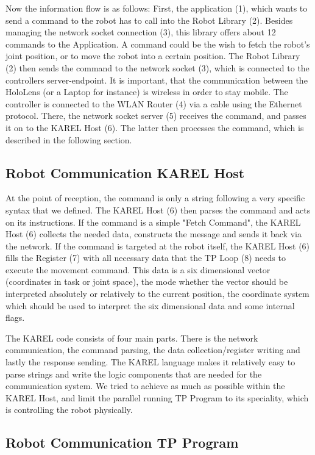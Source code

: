 Now the information flow is as follows: First, the application (1), which wants to send a command to the robot has to call into the Robot Library (2). Besides managing the network socket connection (3), this library offers about 12 commands to the Application. A command could be the wish to fetch the robot's joint position, or to move the robot into a certain position. The Robot Library (2) then sends the command to the network socket (3), which is connected to the controllers server-endpoint. It is important, that the communication between the HoloLens (or a Laptop for instance) is wireless in order to stay mobile. The controller is connected to the WLAN Router (4) via a cable using the Ethernet protocol. There, the network socket server (5) receives the command, and passes it on to the KAREL Host (6). The latter then processes the command, which is described in the following section.

\subsection{Robot Communication KAREL Host}

At the point of reception, the command is only a string following a very specific syntax that we defined. The KAREL Host (6) then parses the command and acts on its instructions. If the command is a simple "Fetch Command", the KAREL Host (6) collects the needed data, constructs the message and sends it back via the network. If the command is targeted at the robot itself, the KAREL Host (6) fills the Register (7) with all necessary data that the TP Loop (8) needs to execute the movement command. This data is a six dimensional vector (coordinates in task or joint space), the mode whether the vector should be interpreted absolutely or relatively to the current position, the coordinate system which should be used to interpret the six dimensional data and some internal flags.

The KAREL code consists of four main parts. There is the network communication, the command parsing, the data collection/register writing and lastly the response sending. The KAREL language makes it relatively easy to parse strings and write the logic components that are needed for the communication system. We tried to achieve as much as possible within the KAREL Host, and limit the parallel running TP Program to its speciality, which is controlling the robot physically.

\subsection{Robot Communication TP Program}

